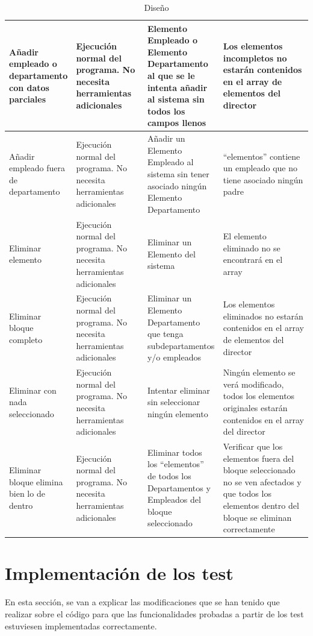 \documentclass[openany]{article}
\begin{document}
\begin{table}[H]
\begin{tabular}{|>{\raggedright\arraybackslash}p{0.15\linewidth}|>{\raggedright\arraybackslash}p{0.25\linewidth}|>{\raggedright\arraybackslash}p{0.25\linewidth}|>{\raggedright\arraybackslash}p{0.35\linewidth}|}
         Añadir empleado o departamento con datos parciales&  Ejecución normal del programa. No necesita herramientas adicionales&  Elemento Empleado o Elemento Departamento al que se le intenta añadir al sistema sin todos los campos llenos&Los elementos incompletos no estarán contenidos en el array de elementos del director\\ \hline 
         Añadir empleado fuera de departamento&  Ejecución normal del programa. No necesita herramientas adicionales&  Añadir un Elemento Empleado al sistema sin tener asociado ningún Elemento Departamento&“elementos” contiene un empleado que no tiene asociado ningún padre\\ \hline 
         Eliminar elemento&  Ejecución normal del programa. No necesita herramientas adicionales&  Eliminar un Elemento del sistema&El elemento eliminado no se encontrará en el array\\ \hline 
         Eliminar bloque completo&  Ejecución normal del programa. No necesita herramientas adicionales&Eliminar un Elemento Departamento que tenga subdepartamentos y/o empleados&Los elementos eliminados no estarán contenidos en el array de elementos del director\\ \hline 
         Eliminar con nada seleccionado&  Ejecución normal del programa. No necesita herramientas adicionales&  Intentar eliminar sin seleccionar ningún elemento&Ningún elemento se verá modificado, todos los elementos originales estarán contenidos en el array del director\\ \hline 
         Eliminar bloque elimina bien lo de dentro&  Ejecución normal del programa. No necesita herramientas adicionales&  Eliminar todos los “elementos” de todos los Departamentos y Empleados del bloque seleccionado&Verificar que los elementos fuera del bloque seleccionado no se ven afectados y que todos los elementos dentro del bloque se eliminan correctamente\\ \hline
    \end{tabular}
    \caption{Diseño}
    \label{tab:my_label}
\end{table}
\restoregeometry
\pagebreak
\section{Implementación de los test}\label{test}

En esta sección, se van a explicar las modificaciones que se han tenido
que realizar sobre el código para que las funcionalidades probadas a
partir de los test estuviesen implementadas correctamente.
\end{document}
